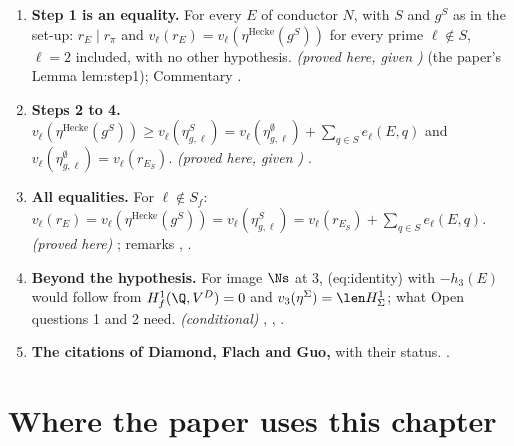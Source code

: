 \begin{enumerate}[label=\textbf{\thechapter.\arabic*}]
\item \textbf{Step 1 is an equality.} For every $E$ of conductor $N$, with $S$ and $g^S$ as in the set-up: $r_E\mid r_\pi$ and $v_\ell(r_E)=v_\ell(\eta^{\mathrm{Hecke}}(g^S))$ for every prime $\ell\notin S$, $\ell=2$ included, with no other hypothesis. \emph{(proved here, given )}
 (the paper's Lemma lem:step1); Commentary .
\item \textbf{Steps 2 to 4.} $v_\ell(\eta^{\mathrm{Hecke}}(g^S))\ge v_\ell(\eta^S_{g,\ell})=v_\ell(\eta^\emptyset_{g,\ell})+\sum_{q\in S}e_\ell(E,q)$ and $v_\ell(\eta^\emptyset_{g,\ell})=v_\ell(r_{E_S})$. \emph{(proved here, given )}
.
\item \textbf{All equalities.} For $\ell\notin S_f$: $v_\ell(r_E)=v_\ell(\eta^{\mathrm{Hecke}}(g^S))=v_\ell(\eta^S_{g,\ell})=v_\ell(r_{E_S})+\sum_{q\in S}e_\ell(E,q)$. \emph{(proved here)} ; remarks
, .
\item \textbf{Beyond the hypothesis.} For image $\Ns$ at $3$, (eq:identity) with $-h_3(E)$ would follow from $H^1_f(\Q,V^D)=0$ and $v_3(\eta^\Sigma)=\len H^1_\Sigma$; what Open questions 1 and 2 need. \emph{(conditional)}
, , .
\item \textbf{The citations of Diamond, Flach and Guo,} with their status. .
\end{enumerate}

\section*{Where the paper uses this chapter}

